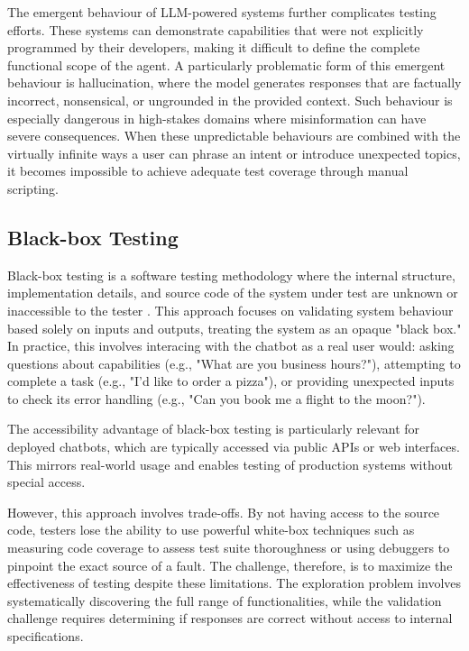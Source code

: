 The emergent behaviour of \ac{LLM}-powered systems further complicates testing efforts.
These systems can demonstrate capabilities
that were not explicitly programmed by their developers,
making it difficult to define the complete functional scope of the agent.
A particularly problematic form of this emergent behaviour is hallucination,
where the model generates responses that are
factually incorrect, nonsensical, or ungrounded in the provided context.
Such behaviour is especially dangerous in high-stakes domains
where misinformation can have severe consequences.
When these unpredictable behaviours are combined
with the virtually infinite ways a user can
phrase an intent or introduce unexpected topics,
it becomes impossible to achieve adequate test coverage through manual scripting.

\subsection{Black-box Testing}

Black-box testing is a software testing methodology
where the internal structure, implementation details, and source code of the system under test
are unknown or inaccessible to the tester
\autocite{ammannIntroductionSoftwareTesting2017}.
This approach focuses on validating system behaviour based solely on inputs and outputs,
treating the system as an opaque "black box."
In practice, this involves interacing with the chatbot as a real user would:
asking questions about capabilities
(e.g., "What are you business hours?"),
attempting to complete a task
(e.g., "I'd like to order a pizza"),
or providing unexpected inputs to check its error handling
(e.g., "Can you book me a flight to the moon?").

The accessibility advantage of black-box testing
is particularly relevant for deployed chatbots,
which are typically accessed via public \acp{API} or web interfaces.
This mirrors real-world usage
and enables testing of production systems without special access.


However, this approach involves trade-offs.
By not having access to the source code,
testers lose the ability to use powerful white-box techniques
such as measuring code coverage to assess test suite thoroughness
or using debuggers to pinpoint the exact source of a fault.
The challenge, therefore, is
to maximize the effectiveness of testing
despite these limitations.
The exploration problem involves
systematically discovering the full range of functionalities,
while the validation challenge requires
determining if responses are correct
without access to internal specifications.

